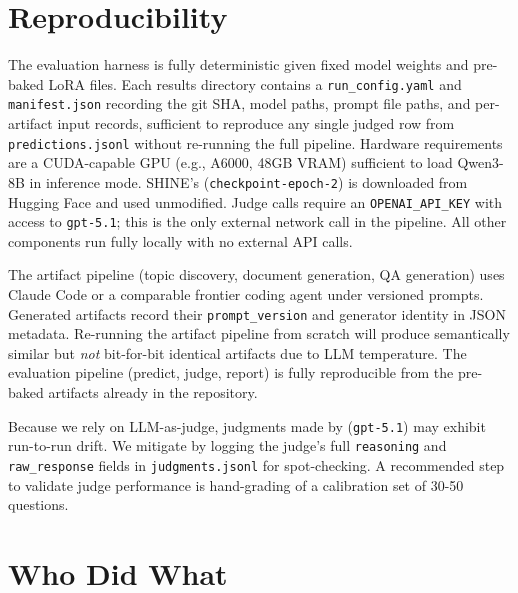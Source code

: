 \documentclass[conference,10.5pt]{IEEEtran}
\begin{document}
\section{Reproducibility}

The evaluation harness is fully deterministic given fixed model weights and
pre-baked LoRA files.  Each results directory contains a
\texttt{run\_config.yaml} and \texttt{manifest.json} recording the git
SHA, model paths, prompt file paths, and per-artifact input records,
sufficient to reproduce any single judged row from
\texttt{predictions.jsonl} without re-running the full pipeline.
Hardware requirements are a CUDA-capable GPU (e.g., A6000, 48GB VRAM) 
sufficient to load Qwen3-8B in inference mode.
SHINE's (\texttt{checkpoint-epoch-2}) is downloaded from Hugging Face 
and used unmodified. Judge calls require an \texttt{OPENAI\_API\_KEY} 
with access to \texttt{gpt-5.1}; this is the only external network call 
in the pipeline.  All other components run fully locally with no external 
API calls.
 
The artifact pipeline (topic discovery, document generation, QA
generation) uses Claude Code or a comparable frontier coding agent under
versioned prompts.  Generated artifacts record their \texttt{prompt\_version}
and generator identity in JSON metadata.  Re-running the artifact
pipeline from scratch will produce semantically similar but \textit{not}
bit-for-bit identical artifacts due to LLM temperature.  The evaluation
pipeline (predict, judge, report) is fully reproducible from the
pre-baked artifacts already in the repository.

Because we rely on LLM-as-judge, judgments made by (\texttt{gpt-5.1}) may
exhibit run-to-run drift. We mitigate by logging the judge's full
\texttt{reasoning} and \texttt{raw\_response} fields in
\texttt{judgments.jsonl} for spot-checking. A recommended step to 
validate judge performance is hand-grading of a calibration set of 
30-50 questions.



\section{Who Did What}
 
\end{document}
